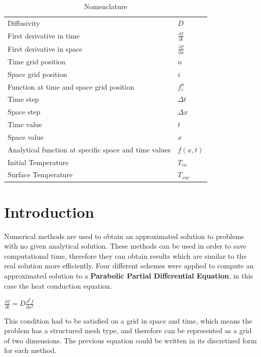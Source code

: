 \documentclass[12pt]{article}
\begin{document}

\begin{table}[tb]
\caption{Nomenclature}
\label{tab:notation}
\centering
\def\arraystretch{1.5}
\begin{tabular}{ll}
Diffusivity & $D$\\
First derivative in time & $\frac{\partial f}{\partial t}$\\
First derivative in space & $\frac{\partial f}{\partial x}$\\
Time grid position & $n$\\
Space grid position & $i$\\
Function at time and space grid position & $f_i^n$\\
Time step & $\Delta t$\\
Space step & $\Delta x$\\
Time value & $t$\\
Space value & $x$\\
Analytical function at specific space and time values& $f(x, t)$\\
Initial Temperature& $T_{in}$\\
Surface Temperature& $T_{sur}$\\
\end{tabular}
\end{table}


\section*{Introduction}
Numerical methods are used to obtain an approximated solution to problems with no given analytical solution. These methods can be used in order to save computational time, therefore they can obtain results which are similar to the real solution more efficiently. Four different schemes were applied to compute an approximated solution to a \textbf{Parabolic Partial Differential Equation}, in this case the heat conduction equation. 
\begin{center}
\Large
$
\frac{\partial f}{\partial t} = D\frac{\partial ^2 f}{\partial x^2} 
$
\end{center}
\par 
This condition had to be satisfied on a grid in space and time, which means the problem has a structured mesh type, and therefore can be represented as a grid of two dimensions. The previous equation could be written in its discretized form for each method.
\end{document}
